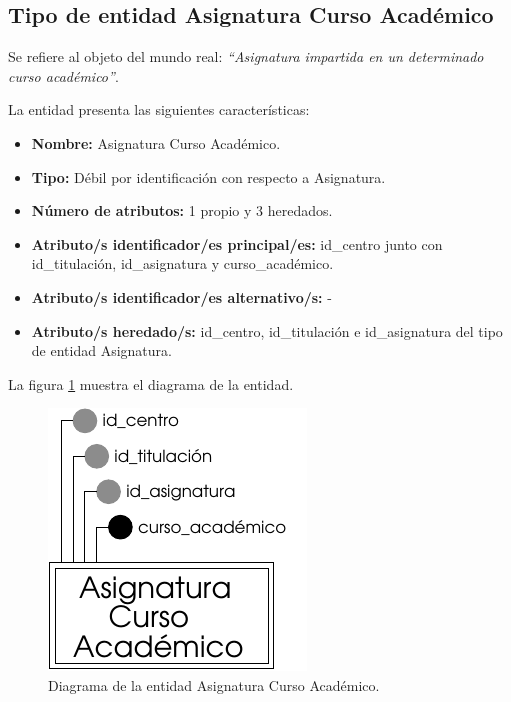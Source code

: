 \subsection{Tipo de entidad Asignatura Curso Académico}

   \begin{description}

   \item[Definición] Se refiere al objeto del mundo real: \emph{``Asignatura
   impartida en un determinado curso académico''}.

   \item[Características] La entidad presenta las siguientes características:
      \begin{itemize}
         \item \textbf{Nombre:} Asignatura Curso Académico.
         \item \textbf{Tipo:} Débil por identificación con respecto a Asignatura.
         \item \textbf{Número de atributos:} 1 propio y 3 heredados.
         \item \textbf{Atributo/s identificador/es principal/es:} id\_centro junto con \\id\_titulación, id\_asignatura y curso\_académico.
         \item \textbf{Atributo/s identificador/es alternativo/s:} -
         \item \textbf{Atributo/s heredado/s:} id\_centro, id\_titulación e
         id\_asignatura del tipo de entidad Asignatura.
      \end{itemize}

   \item[Diagrama] La figura \ref{diagramaACA} muestra el diagrama de la entidad.
   \item \begin{figure}[!ht]
            \begin{center}
            \includegraphics[]{07.Modelo_Entidad-Interrelacion/7.2.Analisis_Entidades/diagramas/aca.pdf}
            \caption{Diagrama de la entidad Asignatura Curso Académico.}
            \label{diagramaACA}
            \end{center}
         \end{figure}


\end{description}
